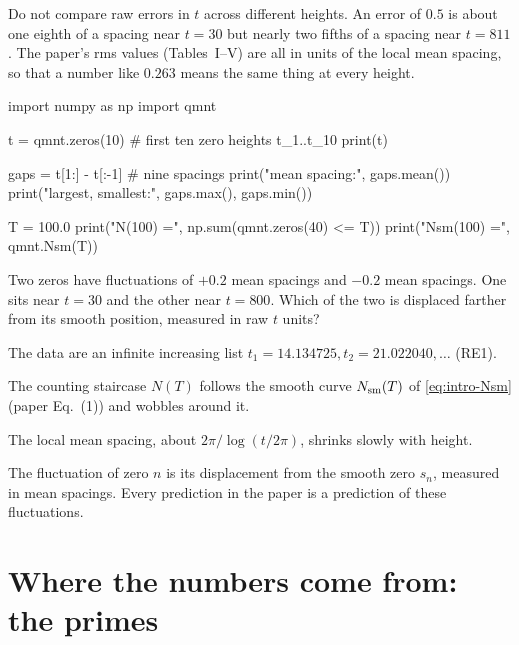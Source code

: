 \begin{pitfall}
Do not compare raw errors in $t$ across different heights. An error of $0.5$ is about one eighth of a spacing near $t=30$ but nearly two fifths of a spacing near $t = 811$. The paper's rms values (Tables~I--V) are all in units of the local mean spacing, so that a number like $0.263$ means the same thing at every height.
\end{pitfall}

\begin{pycode}
import numpy as np
import qmnt

t = qmnt.zeros(10)          # first ten zero heights t_1..t_10
print(t)

gaps = t[1:] - t[:-1]       # nine spacings
print("mean spacing:", gaps.mean())
print("largest, smallest:", gaps.max(), gaps.min())

T = 100.0
print("N(100) =", np.sum(qmnt.zeros(40) <= T))
print("Nsm(100) =", qmnt.Nsm(T))
\end{pycode}

\begin{checkpoint}
Two zeros have fluctuations of $+0.2$ mean spacings and $-0.2$ mean spacings. One sits near $t = 30$ and the other near $t=800$. Which of the two is displaced farther from its smooth position, measured in raw $t$ units?
\end{checkpoint}

\begin{keyideas}
\item The data are an infinite increasing list $t_1 = 14.134725, t_2 = 21.022040,\ldots$ (RE1).
\item The counting staircase $N(T)$ follows the smooth curve $N_{\mathrm{sm}}(T)$ of \cref{eq:intro-Nsm} (paper Eq.~(1)) and wobbles around it.
\item The local mean spacing, about $2\pi/\log(t/2\pi)$, shrinks slowly with height.
\item The fluctuation of zero $n$ is its displacement from the smooth zero $s_n$, measured in mean spacings. Every prediction in the paper is a prediction of these fluctuations.
\end{keyideas}

\section{Where the numbers come from: the primes}\label{sec:intro-primes}

